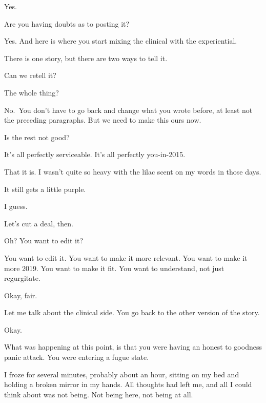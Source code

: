 \begin{paracol}{2}
\begin{leftcolumn}
\begin{ally}
Yes.
\end{ally}
Are you having doubts as to posting it?

\begin{ally}
Yes. And here is where you start mixing the clinical with the experiential.
\end{ally}
There is one story, but there are two ways to tell it.

\begin{ally}
Can we retell it?
\end{ally}
The whole thing?

\begin{ally}
No.~You don't have to go back and change what you wrote before, at least not the preceding paragraphs. But we need to make this ours now.
\end{ally}
Is the rest not good?

\begin{ally}
It's all perfectly serviceable. It's all perfectly you-in-2015.
\end{ally}
That it is. I wasn't quite so heavy with the lilac scent on my words in those days.

\begin{ally}
It still gets a little purple.
\end{ally}
I guess.

\begin{ally}
Let's cut a deal, then.
\end{ally}
Oh? You want to edit it?

\begin{ally}
You want to edit it. You want to make it more relevant. You want to make it more 2019. You want to make it fit. You want to understand, not just regurgitate.
\end{ally}
Okay, fair.

\begin{ally}
Let me talk about the clinical side. You go back to the other version of the story.
\end{ally}
Okay.

\begin{ally}
What was happening at this point, is that you were having an honest to goodness panic attack. You were entering a fugue state.
\end{ally}
I froze for several minutes, probably about an hour, sitting on my bed and holding a broken mirror in my hands. All thoughts had left me, and all I could think about was not being. Not being here, not being at all.


\end{leftcolumn}
\end{paracol}
